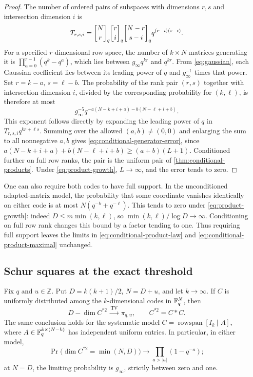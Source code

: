 \begin{proof}
The number of ordered pairs of subspaces with dimensions $r,s$ and
intersection dimension $i$ is
\[
 T_{r,s,i}=\qbinom Nr\qbinom ri\qbinom{N-r}{s-i}
              q^{(r-i)(s-i)}.
\]
For a specified $r$-dimensional row space, the number of $k\times N$
matrices generating it is
$\prod_{a=0}^{r-1}(q^k-q^a)$, which lies between
$g_\infty q^{kr}$ and $q^{kr}$.  From \eqref{eq:gaussian}, each
Gaussian coefficient lies between its leading power of $q$ and
$g_\infty^{-1}$ times that power.  Set $r=k-a$, $s=\ell-b$.
The probability of the rank pair $(r,s)$ together with intersection
dimension $i$, divided by the corresponding probability for $(k,\ell)$,
is therefore at most
\[
 g_\infty^{-5}
 q^{-a(N-k+i+a)-b(N-\ell+i+b)}.
\]
This exponent follows directly by expanding the leading power of
$q$ in $T_{r,s,i}q^{kr+\ell s}$.  Summing over the allowed
$(a,b)\ne(0,0)$ and enlarging the sum to all nonnegative $a,b$ gives
\eqref{eq:conditional-generator-error}, since
$a(N-k+i+a)+b(N-\ell+i+b)\ge(a+b)(L+1)$.
Conditioned further on full row ranks, the pair is the uniform pair
of \cref{thm:conditional-products}.  Under
\eqref{eq:product-growth}, $L\to\infty$, and the error tends to zero.
\end{proof}

One can also require both codes to have full support.  In the
unconditioned adapted-matrix model, the probability that some coordinate
vanishes identically on either code is at most
$N(q^{-k}+q^{-\ell})$.  This tends to zero under
\eqref{eq:product-growth}: indeed $D\le m\min(k,\ell)$, so
$\min(k,\ell)/\log D\to\infty$.  Conditioning on full row rank
changes this bound by a factor tending to one.  Thus requiring full
support leaves the limits in \eqref{eq:conditional-product-law} and
\eqref{eq:conditional-product-maximal} unchanged.

\subsection{Schur squares at the exact threshold}

\begin{corollary}
\label{cor:square-codes}
Fix $q$ and $u\in\mathbb Z$.  Put
$D=k(k+1)/2$, $N=D+u$, and let $k\to\infty$.  If $C$ is uniformly
distributed among the $k$-dimensional codes in $\mathbb F_q^N$, then
\[
 D-\dim C^{*2}\ \xrightarrow{\mathrm{TV}}\ \pi_{q,u},
 \qquad C^{*2}=C*C.
\]
The same conclusion holds for the systematic model
$C=\operatorname{rowspan}[I_k\mid A]$, where
$A\in\mathbb F_q^{k\times(N-k)}$ has independent uniform entries.
In particular, in either model,
\begin{equation}\label{eq:square-threshold}
 \Pr\bigl(\dim C^{*2}=\min(N,D)\bigr)
 \longrightarrow\prod_{a>|u|}(1-q^{-a});
\end{equation}
at $N=D$, the limiting probability is $g_\infty$, strictly between
zero and one.
\end{corollary}

